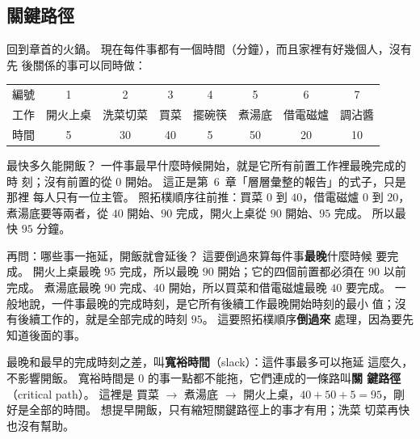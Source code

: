 \subsection{關鍵路徑}
\label{sec:critical-path}

回到章首的火鍋。 現在每件事都有一個時間（分鐘），而且家裡有好幾個人，沒有先
後關係的事可以同時做：

\begin{center}
\begin{tabular}{lccccccc}
\toprule
編號 & 1 & 2 & 3 & 4 & 5 & 6 & 7 \\
工作 & 開火上桌 & 洗菜切菜 & 買菜 & 擺碗筷 & 煮湯底 & 借電磁爐 & 調沾醬 \\
時間 & 5 & 30 & 40 & 5 & 50 & 20 & 10 \\
\bottomrule
\end{tabular}
\end{center}

最快多久能開飯？ 一件事最早什麼時候開始，就是它所有前置工作裡最晚完成的時
刻；沒有前置的從 $0$ 開始。 這正是第~6~章「層層彙整的報告」的式子，只是那裡
每人只有一位主管。 照拓樸順序往前推：買菜 $0$ 到 $40$，借電磁爐 $0$ 到 $20$，
煮湯底要等兩者，從 $40$ 開始、$90$ 完成，開火上桌從 $90$ 開始、$95$ 完成。
所以最快 $95$ 分鐘。

再問：哪些事一拖延，開飯就會延後？ 這要倒過來算每件事\textbf{最晚}什麼時候
要完成。 開火上桌最晚 $95$ 完成，所以最晚 $90$ 開始；它的四個前置都必須在
$90$ 以前完成。 煮湯底最晚 $90$ 完成、$40$ 開始，所以買菜和借電磁爐最晚 $40$
要完成。 一般地說，一件事最晚的完成時刻，是它所有後續工作最晚開始時刻的最小
值；沒有後續工作的，就是全部完成的時刻 $95$。 這要照拓樸順序\textbf{倒過來}
處理，因為要先知道後面的事。

最晚和最早的完成時刻之差，叫\textbf{寬裕時間}（slack）：這件事最多可以拖延
這麼久，不影響開飯。 寬裕時間是 $0$ 的事一點都不能拖，它們連成的一條路叫\textbf{關
鍵路徑}（critical path）。 這裡是 買菜 $\to$ 煮湯底 $\to$ 開火上桌，$40 + 50
+ 5 = 95$，剛好是全部的時間。 想提早開飯，只有縮短關鍵路徑上的事才有用；洗菜
切菜再快也沒有幫助。

